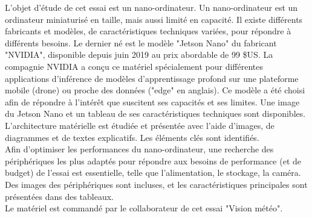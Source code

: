 ﻿\noindent L'objet d'étude de cet essai est un nano-ordinateur. Un nano-ordinateur est un ordinateur miniaturisé en taille, mais aussi limité en capacité. Il existe différents fabricants et modèles, de caractéristiques techniques variées, pour répondre à différents besoins. Le dernier né est le modèle "Jetson Nano" du fabricant "NVIDIA", disponible depuis juin 2019 au prix abordable de 99 \$US. La compagnie NVIDIA a conçu ce matériel spécialement pour différentes applications d'inférence de modèles d'apprentissage profond sur une plateforme mobile (drone) ou proche des données ("edge" en anglais). Ce modèle a été choisi afin de répondre à l'intérêt que suscitent ses capacités et ses limites. Une image du Jetson Nano et un tableau de ses caractéristiques techniques sont disponibles. 
\vspace{\baselineskip}
\\
\noindent L'architecture matérielle est étudiée et présentée avec l'aide d'images, de diagrammes et de textes explicatifs. Les éléments clés sont identifiés.
\vspace{\baselineskip}
\\
\noindent Afin d'optimiser les performances du nano-ordinateur, une recherche des périphériques les plus adaptés pour répondre aux besoins de performance (et de budget) de l'essai est essentielle, telle que l'alimentation, le stockage, la caméra. Des images des périphériques sont incluses, et les caractéristiques principales sont présentées dans des tableaux.
\vspace{\baselineskip}
\\
\noindent Le matériel est commandé par le collaborateur de cet essai "Vision météo".